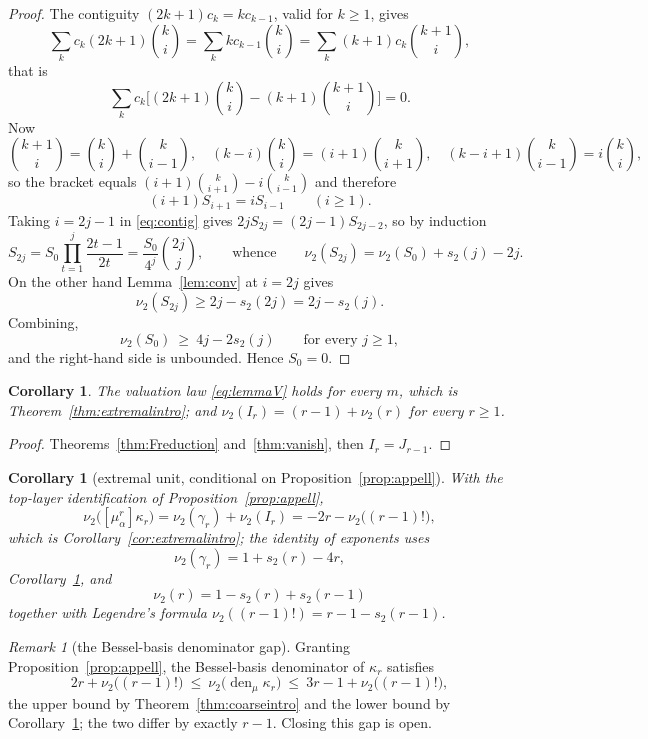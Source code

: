 \documentclass[12pt]{amsart}
\newtheorem{corollary}[theorem]{Corollary}
\theoremstyle{definition}
\theoremstyle{remark}
\newtheorem{remark}[theorem]{Remark}
\DeclareMathOperator{\den}{den}
\newcommand{\ma}{\mu_\alpha}
\begin{document}
\begin{proof}
The contiguity $(2k+1)c_k=kc_{k-1}$, valid for $k\ge1$, gives
\[
  \sum_kc_k(2k+1)\binom ki=\sum_kkc_{k-1}\binom ki =\sum_k(k+1)c_k\binom{k+1}i ,
\]
that is
\[
\sum_kc_k\bigl[(2k+1)\binom ki-(k+1)\binom{k+1}i\bigr]=0.
\]
Now
\[
\binom{k+1}i=\binom ki+\binom k{i-1}, \quad (k-i)\binom ki=(i+1)\binom k{i+1}, \quad (k-i+1)\binom k{i-1}=i\binom ki,
\]
so the bracket equals $(i+1)\binom k{i+1}-i\binom k{i-1}$ and therefore
\begin{equation}\label{eq:contig}
  (i+1)S_{i+1}=iS_{i-1}\qquad(i\ge1).
\end{equation}
Taking $i=2j-1$ in \eqref{eq:contig} gives $2jS_{2j}=(2j-1)S_{2j-2}$, so by induction
\[
  S_{2j}=S_0\prod_{t=1}^j\frac{2t-1}{2t}=\frac{S_0}{4^j}\binom{2j}j,   \qquad\text{whence}\qquad   \nu_2(S_{2j})=\nu_2(S_0)+s_2(j)-2j .
\]
On the other hand Lemma~\ref{lem:conv} at $i=2j$ gives
\[
\nu_2(S_{2j})\ge 2j-s_2(2j)=2j-s_2(j).
\]
Combining,
\[
  \nu_2(S_0)\ \ge\ 4j-2s_2(j)\qquad\text{for every }j\ge1 ,
\]
and the right-hand side is unbounded.  Hence $S_0=0$.
\end{proof}

\begin{corollary}\label{cor:F}
The valuation law \eqref{eq:lemmaV} holds for every $m$, which is Theorem~\ref{thm:extremalintro}; and $\nu_2(I_r)=(r-1)+\nu_2(r)$ for every $r\ge1$.
\end{corollary}

\begin{proof}
Theorems~\ref{thm:Freduction} and~\ref{thm:vanish}, then $I_r=J_{r-1}$.
\end{proof}

\begin{corollary}[extremal unit, conditional on Proposition~\ref{prop:appell}]\label{cor:extremal}
With the top-layer identification of Proposition~\ref{prop:appell},
\[
\nu_2\bigl([\ma^r]\kappa_r\bigr)=\nu_2(\gamma_r)+\nu_2(I_r)=-2r-\nu_2\bigl((r-1)!\bigr),
\]
which is Corollary~\ref{cor:extremalintro}; the identity of exponents uses
\[
\nu_2(\gamma_r)=1+s_2(r)-4r, 
\]
Corollary~\ref{cor:F}, and
\[
\nu_2(r)=1-s_2(r)+s_2(r-1)
\]
 together with Legendre's formula $\nu_2((r-1)!)=r-1-s_2(r-1)$.
\end{corollary}

\begin{remark}[the Bessel-basis denominator gap]\label{rem:besselgap}
Granting Proposition~\ref{prop:appell}, the Bessel-basis denominator of $\kappa_r$ satisfies
\[
  2r+\nu_2\bigl((r-1)!\bigr)\ \le\
  \nu_2\bigl(\den\nolimits_\mu\kappa_r\bigr)\ \le\
  3r-1+\nu_2\bigl((r-1)!\bigr),
\]
the upper bound by Theorem~\ref{thm:coarseintro} and the lower bound by Corollary~\ref{cor:extremal}; the two differ by exactly $r-1$.  Closing this gap is open.
\end{remark}
\end{document}

